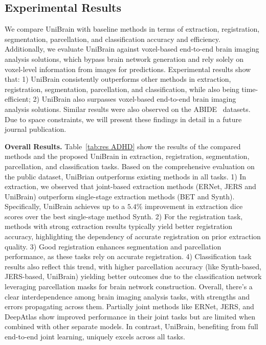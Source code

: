 



\subsection{Experimental Results}
We compare UniBrain with baseline methods in terms of extraction, registration, segmentation, parcellation, and classification accuracy and efficiency. Additionally, we evaluate UniBrain against voxel-based end-to-end brain imaging analysis solutions, which bypass brain network generation and rely solely on voxel-level information from images for predictions.
Experimental results show that: 1) UniBrain consistently outperforms other methods in extraction, registration, segmentation, parcellation, and classification, while also being time-efficient; 2) UniBrain also surpasses voxel-based end-to-end brain imaging analysis solutions. Similar results were also observed on the ABIDE~\cite{tyszka2014largely} datasets. Due to space constraints, we will present these findings in detail in a future journal publication.


%

\vspace{1pt}
\noindent\textbf{{Overall Results.}} Table~\ref{tab:res ADHD} show the results of the compared methods and the proposed UniBrain in extraction, registration, segmentation, parcellation, and classification tasks. Based on the comprehensive evaluation on the public dataset, UniBrian outperforms existing methods in all tasks. 1) In extraction, we observed that joint-based extraction methods (ERNet, JERS and UniBrain) outperform single-stage extraction methods (BET and Synth). Specifically, UniBrain achieves up to a $5.4\%$ improvement in extraction dice scores over the best single-stage method Synth. 2) For the registration task, methods with strong extraction results typically yield better registration accuracy, highlighting the dependency of accurate registration on prior extraction quality. 3) Good registration enhances segmentation and parcellation performance, as these tasks rely on accurate registration. 4) Classification task results also reflect this trend, with higher parcellation accuracy (like Synth-based, JERS-based, UniBrain) yielding better outcomes due to the classification network leveraging parcellation masks for brain network construction. 
Overall, there's a clear interdependence among brain imaging analysis tasks, with strengths and errors propagating across them. Partially joint methods like ERNet, JERS, and DeepAtlas show improved performance in their joint tasks but are limited when combined with other separate models. In contrast, UniBrain, benefiting from full end-to-end joint learning, uniquely excels across all tasks.

